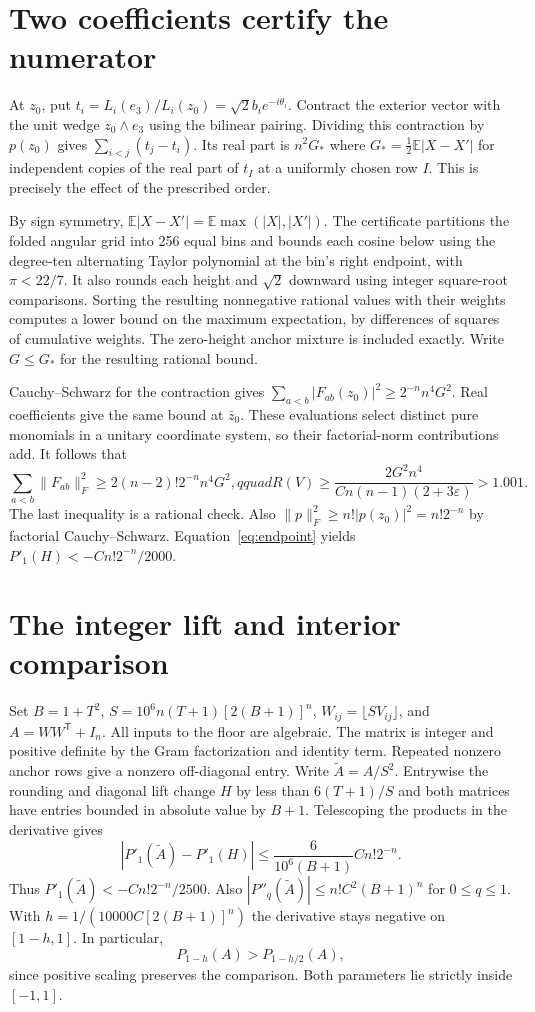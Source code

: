 \documentclass[11pt]{article}
\begin{document}
\section{Two coefficients certify the numerator}

At $z_0$, put $t_i=L_i(e_3)/L_i(z_0)=\sqrt2 b_i e^{-i\theta_i}$. Contract the exterior vector with the unit wedge $z_0\wedge e_3$ using the bilinear pairing. Dividing this contraction by $p(z_0)$ gives $\sum_{i<j}(t_j-t_i)$. Its real part is $n^2G_*$ where $G_*=\tfrac12\mathbb E|X-X'|$ for independent copies of the real part of $t_I$ at a uniformly chosen row $I$. This is precisely the effect of the prescribed order.

By sign symmetry, $\mathbb E|X-X'|=\mathbb E\max(|X|,|X'|)$. The certificate partitions the folded angular grid into 256 equal bins and bounds each cosine below using the degree-ten alternating Taylor polynomial at the bin's right endpoint, with $\pi<22/7$. It also rounds each height and $\sqrt2$ downward using integer square-root comparisons. Sorting the resulting nonnegative rational values with their weights computes a lower bound on the maximum expectation, by differences of squares of cumulative weights. The zero-height anchor mixture is included exactly. Write $G\le G_*$ for the resulting rational bound.

Cauchy--Schwarz for the contraction gives $\sum_{a<b}|F_{ab}(z_0)|^2\ge2^{-n}n^4G^2$. Real coefficients give the same bound at $\bar z_0$. These evaluations select distinct pure monomials in a unitary coordinate system, so their factorial-norm contributions add. It follows that
\[
 \sum_{a<b}\|F_{ab}\|_F^2\ge2(n-2)!2^{-n}n^4G^2,qquad
 R(V)\ge\frac{2G^2n^4}{C n(n-1)(2+3\varepsilon)}>1.001.
\]
The last inequality is a rational check. Also $\|p\|_F^2\ge n!|p(z_0)|^2=n!2^{-n}$ by factorial Cauchy--Schwarz. Equation~\eqref{eq:endpoint} yields $P'_1(H)<-C n!2^{-n}/2000$.

\section{The integer lift and interior comparison}

Set $B=1+T^2$, $S=10^6 n(T+1)[2(B+1)]^n$, $W_{ij}=\lfloor SV_{ij}\rfloor$, and $A=WW^{\mathsf T}+I_n$. All inputs to the floor are algebraic. The matrix is integer and positive definite by the Gram factorization and identity term. Repeated nonzero anchor rows give a nonzero off-diagonal entry. Write $\widetilde A=A/S^2$. Entrywise the rounding and diagonal lift change $H$ by less than $6(T+1)/S$ and both matrices have entries bounded in absolute value by $B+1$. Telescoping the products in the derivative gives
\[
 |P'_1(\widetilde A)-P'_1(H)|\le
 \frac{6}{10^6(B+1)}C n!2^{-n}.
\]
Thus $P'_1(\widetilde A)<-C n!2^{-n}/2500$. Also $|P''_q(\widetilde A)|\le n! C^2(B+1)^n$ for $0\le q\le1$. With $h=1/(10000 C[2(B+1)]^n)$ the derivative stays negative on $[1-h,1]$. In particular,
\[
 P_{1-h}(A)>P_{1-h/2}(A),
\]
since positive scaling preserves the comparison. Both parameters lie strictly inside $[-1,1]$.
\end{document}
